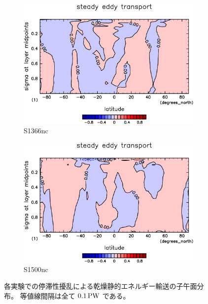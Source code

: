 \documentclass[body]{subfiles}
\begin{document}
\begin{figure}[t]
	\centering
	\begin{subfigure}{.4\textwidth}
		\centering
		\includegraphics[width=\columnwidth]{S1366-nc/MeriHeatTransTest@dryStatEn_SE,time=3650:4015-crop-rotate.pdf}
		\caption{S1366nc}\label{乾燥静的エネルギー停滞性擾乱S1366nc}
	\end{subfigure}
	\begin{subfigure}{.4\textwidth}
		\centering
		\includegraphics[width=\columnwidth]{S1500-nc/MeriHeatTransTest@dryStatEn_SE,time=3650:4015-crop-rotate.pdf}
		\caption{S1500nc}\label{乾燥静的エネルギー停滞性擾乱S1500nc}
	\end{subfigure}
	\caption[各実験でのに停滞性擾乱依る乾燥静的エネルギー輸送の子午面分布]{
		各実験での停滞性擾乱による乾燥静的エネルギー輸送の子午面分布。
		等値線間隔は全て \(0.1\hmu{PW}\) である。
	}\label{乾燥静的エネルギー停滞性擾乱nc}
\end{figure}
\end{document}
